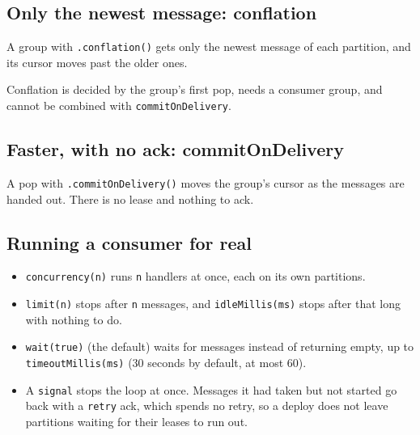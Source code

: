 \subsection{Only the newest message: conflation}

A group with \texttt{.conflation()} gets only the newest message of each partition, and its cursor
moves past the older ones.


 Conflation is decided by the group's first pop, needs a consumer
group, and cannot be combined with \texttt{commitOnDelivery}.

\subsection{Faster, with no ack: commitOnDelivery}

A pop with \texttt{.commitOnDelivery()} moves the group's cursor as the messages are handed out.
There is no lease and nothing to ack.



\subsection{Running a consumer for real}


\begin{itemize}
\item \texttt{concurrency(n)} runs \texttt{n} handlers at once, each on its own partitions.
\item \texttt{limit(n)} stops after \texttt{n} messages, and \texttt{idleMillis(ms)} stops after
that long with nothing to do.
\item \texttt{wait(true)} (the default) waits for messages instead of returning empty, up to
\texttt{timeoutMillis(ms)} (30 seconds by default, at most 60).
\item A \texttt{signal} stops the loop at once. Messages it had taken but not started go back with a
\texttt{retry} ack, which spends no retry, so a deploy does not leave partitions waiting for their
leases to run out.
\end{itemize}


